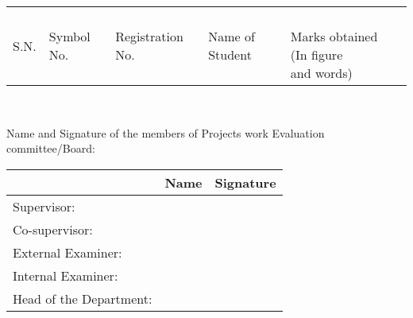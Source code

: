 \begin{tabular}{|l|l|l|l|l|b{4.5cm}|}
	\hline
	S.N. & Symbol No. & Registration No. & Name of Student & \parbox{4.5cm}
	{\fontsize{12pt}{10pt}\selectfont\ \\Marks obtained (In figure\\and words)}
	\\ . & \sym & \reg & \myname & \parbox{4.5cm}{\vspace{1cm}}
	\\ \hline
\end{tabular}\\

\vspace{0.3cm}

Name and Signature of the members of Projects work Evaluation committee/Board:

\begin{tabular}{|l|m{5.5cm}|m{4cm}|}
	\hline
	& Name & Signature \\ \hline
	Supervisor: & \sup & \\ \hline
	Co-supervisor: & \cosup & \\ \hline
	External Examiner: & & \\ \hline
	Internal Examiner: & & \\ \hline
	Head of the Department: & \hod & \\ \hline
\end{tabular}

{\\
}















